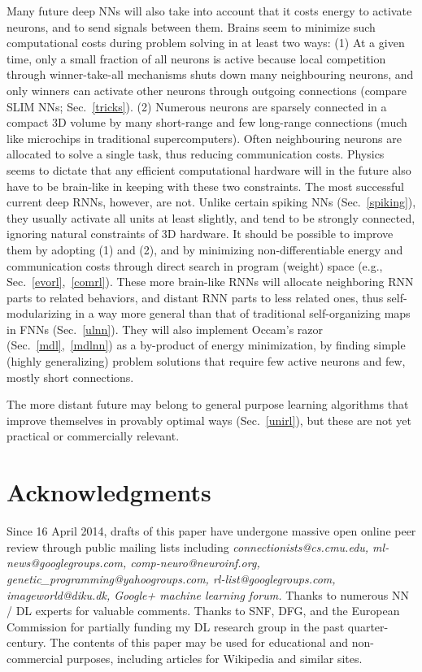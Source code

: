 \documentclass[letterpaper]{article}
\begin{document}
\begin{CJK*}{UTF8}{gbsn}
\begin{sloppypar}
Many future deep NNs will also take into account that it costs energy
to activate neurons, and to send signals between them. Brains seem to
minimize such computational costs during problem solving in at least
two ways: (1) At a given time, only a small fraction of all neurons is
active because local competition through winner-take-all mechanisms
shuts down many neighbouring neurons, and only winners can activate
other neurons through outgoing connections (compare SLIM NNs;
Sec.~\ref{tricks}). (2) Numerous neurons are sparsely connected in a
compact 3D volume by many short-range and few long-range connections
(much like microchips in traditional supercomputers). Often
neighbouring neurons are allocated to solve a single task, thus
reducing communication costs.  Physics seems to dictate that any
efficient computational hardware will in the future also have to be
brain-like in keeping with these two constraints. The most successful
current deep RNNs, however, are not. Unlike certain spiking NNs
(Sec.~\ref{spiking}), they usually activate all units at least slightly,
and tend to be strongly connected, ignoring natural constraints of 3D
hardware. It should be possible to improve them by adopting (1) and
(2), and by minimizing non-differentiable energy and communication
costs through direct search in program (weight) space (e.g.,
Sec.~\ref{evorl},~\ref{comrl}).  These more brain-like RNNs will
allocate neighboring RNN parts to related behaviors, and distant RNN
parts to less related ones, thus self-modularizing in a way more
general than that of traditional self-organizing maps in FNNs
(Sec.~\ref{ulnn}). They will also implement Occam's razor
(Sec.~\ref{mdl},~\ref{mdlnn}) as a by-product of energy minimization,
by finding simple (highly generalizing) problem solutions that require
few active neurons and few, mostly short connections.

The more distant future may belong to general purpose learning
algorithms that improve themselves in provably optimal ways
(Sec.~\ref{unirl}), but these are not yet practical or commercially
relevant.
 



\section{Acknowledgments}
\label{ack}


Since 16 April 2014, drafts of this paper have undergone massive open online peer review through public mailing lists including 
{\em connectionists\-@cs.cmu.edu, ml-news\-@googlegroups.com, comp-neuro\-@neuro\-inf.org, genetic\_pro\-gramming\-@yahoo\-groups.com, rl-list\-@googlegroups.com, image\-world\-@diku.dk, Google+ machine learning forum.} 
Thanks to numerous NN / DL experts for valuable comments. Thanks to SNF, DFG, and the European Commission for partially funding my DL research group in the past quarter-century.
The contents of this paper may be used for educational and non-commercial purposes, including articles for Wikipedia and similar sites.


\end{sloppypar}
\end{CJK*}
\end{document}
